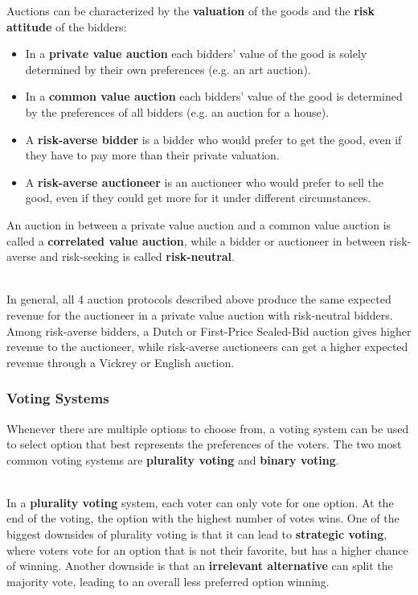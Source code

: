 \documentclass[12pt]{article}
\begin{document}
\noindent
Auctions can be characterized by the \textbf{valuation} of the goods and the \textbf{risk attitude} of the bidders:

\newpage
\begin{itemize}
    \item In a \textbf{private value auction} each bidders' value of the good is solely determined by their own preferences (e.g. an art auction).
    \item In a \textbf{common value auction} each bidders' value of the good is determined by the preferences of all bidders (e.g. an auction for a house).
    \item A \textbf{risk-averse bidder} is a bidder who would prefer to get the good, even if they have to pay more than their private valuation.
    \item A \textbf{risk-averse auctioneer} is an auctioneer who would prefer to sell the good, even if they could get more for it under different circumstances.
\end{itemize}

\noindent
An auction in between a private value auction and a common value auction is called a \textbf{correlated value auction}, while a bidder or auctioneer in between risk-averse and risk-seeking is called \textbf{risk-neutral}.

\noindent
\\
In general, all 4 auction protocols described above produce the same expected revenue for the auctioneer in a private value auction with risk-neutral bidders.
Among risk-averse bidders, a Dutch or First-Price Sealed-Bid auction gives higher revenue to the auctioneer, while risk-averse auctioneers can get a higher expected revenue through a Vickrey or English auction.

\subsubsection{Voting Systems}
Whenever there are multiple options to choose from, a voting system can be used to select option that best represents the preferences of the voters.
The two most common voting systems are \textbf{plurality voting} and \textbf{binary voting}.

\noindent
\\
In a \textbf{plurality voting} system, each voter can only vote for one option.
At the end of the voting, the option with the highest number of votes wins.
One of the biggest downsides of plurality voting is that it can lead to \textbf{strategic voting}, where voters vote for an option that is not their favorite, but has a higher chance of winning.
Another downside is that an \textbf{irrelevant alternative} can split the majority vote, leading to an overall less preferred option winning.
\end{document}
